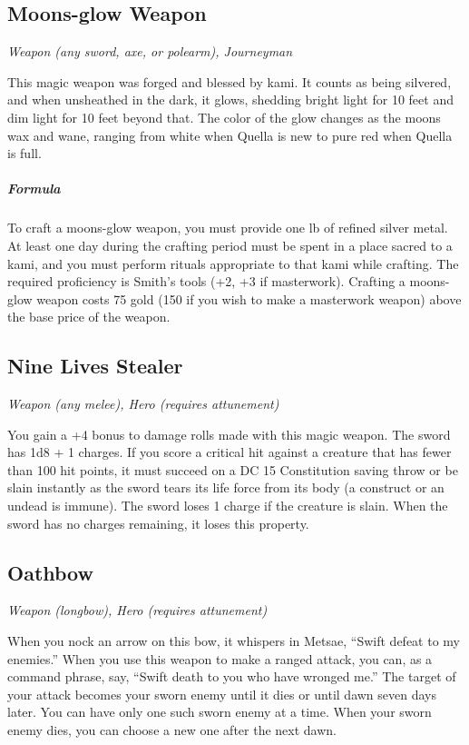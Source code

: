 \subsection{Moons-glow Weapon}
\textit{Weapon (any sword, axe, or polearm), Journeyman}

This magic weapon was forged and blessed by kami. It counts as being silvered, and when unsheathed in the dark, it glows, shedding bright light for 10 feet and dim light for 10 feet beyond that. The color of the glow changes as the moons wax and wane, ranging from white when Quella is new to pure red when Quella is full.

\subparagraph*{Formula} To craft a moons-glow weapon, you must provide one lb of refined silver metal. At least one day during the crafting period must be spent in a place sacred to a kami, and you must perform rituals appropriate to that kami while crafting. The required proficiency is Smith's tools (+2, +3 if masterwork). Crafting a moons-glow weapon costs 75 gold (150 if you wish to make a masterwork weapon) above the base price of the weapon.

\subsection{Nine Lives Stealer}
\textit{Weapon (any melee), Hero (requires attunement)}

You gain a +4 bonus to damage rolls made with this magic weapon. The sword has 1d8 + 1 charges. If you score a critical hit against a creature that has fewer than 100 hit points, it must succeed on a DC 15 Constitution saving throw or be slain instantly as the sword tears its life force from its body (a construct or an undead is immune). The sword loses 1 charge if the creature is slain. When the sword has no charges remaining, it loses this property.

\subsection{Oathbow}
\textit{Weapon (longbow), Hero (requires attunement)}

When you nock an arrow on this bow, it whispers in Metsae, “Swift defeat to my enemies.” When you use this weapon to make a ranged attack, you can, as a command phrase, say, “Swift death to you who have wronged me.” The target of your attack becomes your sworn enemy until it dies or until dawn seven days later. You can have only one such sworn enemy at a time. When your sworn enemy dies, you can choose a new one after the next dawn.

